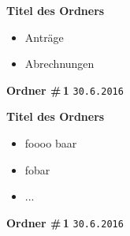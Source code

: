 \documentclass[12pt]{article}
\begin{document}
\begin{center}
  \large \textbf{Titel des Ordners}
  
  
  \begin{itemize}
  	\item Anträge
  	\item Abrechnungen
  \end{itemize}

  \vspace{\fill}

  \textbf{Ordner \#\,1}
  \texttt{30.6.2016}
\end{center}

\newpage

\begin{center}
  \large \textbf{Titel des Ordners}
  
  
  \begin{itemize}
  	\item foooo baar
  	\item fobar
  	\item ...
  \end{itemize}

  \vspace{\fill}

  \textbf{Ordner \#\,1}
  \texttt{30.6.2016}
\end{center}

\end{document}
